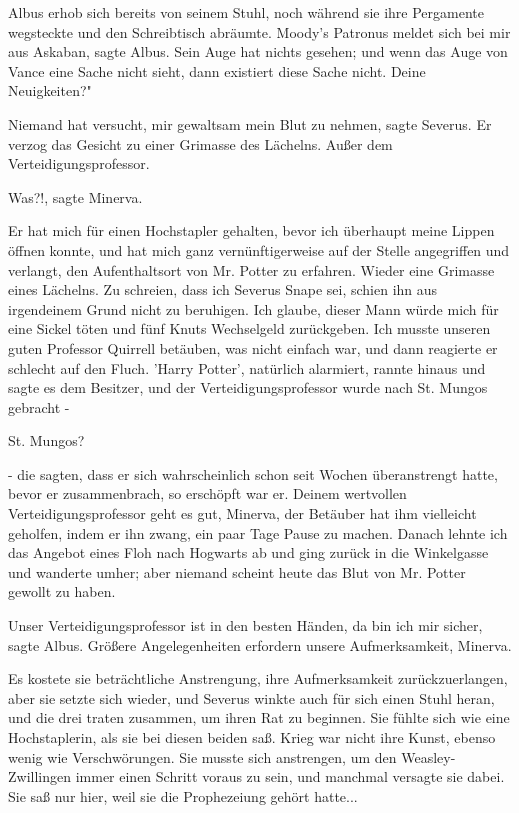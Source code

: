 Albus erhob sich bereits von seinem Stuhl, noch während sie ihre Pergamente
wegsteckte und den Schreibtisch abräumte. \glqq Moody's Patronus meldet sich bei
mir aus Askaban\grqq{}, sagte Albus. \glqq Sein Auge hat nichts gesehen; und
wenn das Auge von Vance eine Sache nicht sieht, dann existiert diese Sache
nicht. Deine Neuigkeiten?"

\glqq Niemand hat versucht, mir gewaltsam mein Blut zu nehmen\grqq{}, sagte
Severus. Er verzog das Gesicht zu einer Grimasse des Lächelns. \glqq Außer dem
Verteidigungsprofessor.\grqq{}

\glqq Was?!\grqq{}, sagte Minerva.

\glqq Er hat mich für einen Hochstapler gehalten, bevor ich überhaupt meine
Lippen öffnen konnte, und hat mich ganz vernünftigerweise auf der Stelle
angegriffen und verlangt, den Aufenthaltsort von Mr. Potter zu erfahren.\grqq{}
Wieder eine Grimasse eines Lächelns. \glqq Zu schreien, dass ich Severus Snape
sei, schien ihn aus irgendeinem Grund nicht zu beruhigen. Ich glaube, dieser
Mann würde mich für eine Sickel töten und fünf Knuts Wechselgeld zurückgeben.
Ich musste unseren guten Professor Quirrell betäuben, was nicht einfach war, und
dann reagierte er schlecht auf den Fluch. 'Harry Potter', natürlich alarmiert,
rannte hinaus und sagte es dem Besitzer, und der Verteidigungsprofessor wurde
nach St. Mungos gebracht -\grqq{}

\glqq St. Mungos?\grqq{}

\glqq - die sagten, dass er sich wahrscheinlich schon seit Wochen überanstrengt
hatte, bevor er zusammenbrach, so erschöpft war er. Deinem wertvollen
Verteidigungsprofessor geht es gut, Minerva, der Betäuber hat ihm vielleicht
geholfen, indem er ihn zwang, ein paar Tage Pause zu machen. Danach lehnte ich
das Angebot eines Floh nach Hogwarts ab und ging zurück in die Winkelgasse und
wanderte umher; aber niemand scheint heute das Blut von Mr. Potter gewollt zu
haben.\grqq{}

\glqq Unser Verteidigungsprofessor ist in den besten Händen, da bin ich mir
sicher\grqq{}, sagte Albus. \glqq Größere Angelegenheiten erfordern unsere
Aufmerksamkeit, Minerva.\grqq{}

Es kostete sie beträchtliche Anstrengung, ihre Aufmerksamkeit zurückzuerlangen,
aber sie setzte sich wieder, und Severus winkte auch für sich einen Stuhl heran,
und die drei traten zusammen, um ihren Rat zu beginnen. Sie fühlte sich wie eine
Hochstaplerin, als sie bei diesen beiden saß. Krieg war nicht ihre Kunst, ebenso
wenig wie Verschwörungen. Sie musste sich anstrengen, um den Weasley-Zwillingen
immer einen Schritt voraus zu sein, und manchmal versagte sie dabei. Sie saß nur
hier, weil sie die Prophezeiung gehört hatte...

